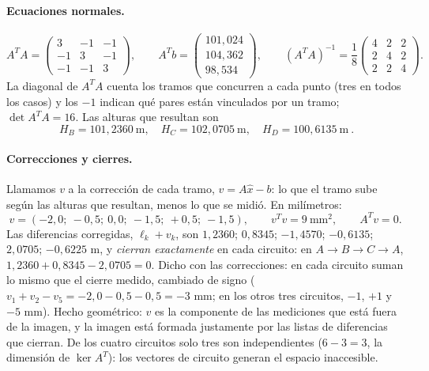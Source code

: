 \paragraph{Ecuaciones normales.}
\[
  A^TA=\begin{pmatrix}3&-1&-1\\-1&3&-1\\-1&-1&3\end{pmatrix},\qquad
  A^Tb=\begin{pmatrix}101{,}024\\104{,}362\\98{,}534\end{pmatrix},\qquad
  (A^TA)^{-1}=\frac18\begin{pmatrix}4&2&2\\2&4&2\\2&2&4\end{pmatrix}.
\]
La diagonal de \(A^TA\) cuenta los tramos que concurren a cada punto (tres en todos los casos)
y los \(-1\) indican qué pares están vinculados por un tramo; \(\det A^TA=16\). Las alturas
que resultan son
\[
  \boxed{\ H_B=101{,}2360\ \text{m},\quad H_C=102{,}0705\ \text{m},\quad H_D=100{,}6135\ \text{m}\ } .
\]

\paragraph{Correcciones y cierres.} Llamamos \(v\) a la corrección de cada tramo,
\(v=A\hat x-b\): lo que el tramo sube según las alturas que resultan, menos lo que se midió.
En milímetros:
\[
  v=(-2{,}0;\ -0{,}5;\ 0{,}0;\ -1{,}5;\ +0{,}5;\ -1{,}5),\qquad v^Tv=9\ \text{mm}^2,
  \qquad A^Tv=0 .
\]
Las diferencias corregidas, \(\ell_k+v_k\), son \(1{,}2360\); \(0{,}8345\); \(-1{,}4570\);
\(-0{,}6135\); \(2{,}0705\); \(-0{,}6225\) m, y \emph{cierran exactamente} en cada circuito:
en \(A\to B\to C\to A\), \(1{,}2360+0{,}8345-2{,}0705=0\). Dicho con las correcciones: en cada
circuito suman lo mismo que el cierre medido, cambiado de signo
(\(v_1+v_2-v_5=-2{,}0-0{,}5-0{,}5=-3\) mm; en los otros tres circuitos, \(-1\), \(+1\) y
\(-5\) mm). Hecho geométrico: \(v\) es la componente de las mediciones que está fuera de la
imagen, y la imagen está formada justamente por las listas de diferencias que cierran. De
los cuatro circuitos solo tres son independientes (\(6-3=3\), la dimensión de
\(\ker A^T\)): los vectores de circuito generan el espacio inaccesible.

